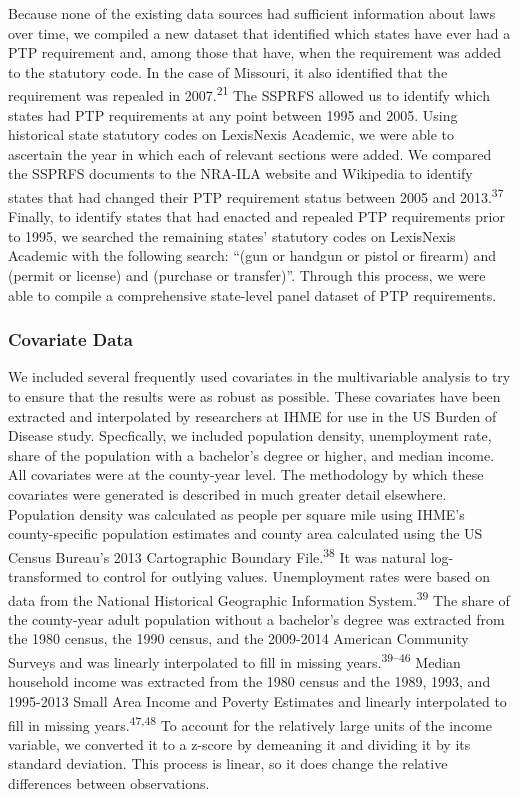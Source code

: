 \documentclass[]{article}
\begin{document}
Because none of the existing data sources had sufficient information
about laws over time, we compiled a new dataset that identified which
states have ever had a PTP requirement and, among those that have, when
the requirement was added to the statutory code. In the case of
Missouri, it also identified that the requirement was repealed in
2007.\textsuperscript{21} The SSPRFS allowed us to identify which states
had PTP requirements at any point between 1995 and 2005. Using
historical state statutory codes on LexisNexis Academic, we were able to
ascertain the year in which each of relevant sections were added. We
compared the SSPRFS documents to the NRA-ILA website and Wikipedia to
identify states that had changed their PTP requirement status between
2005 and 2013.\textsuperscript{37} Finally, to identify states that had
enacted and repealed PTP requirements prior to 1995, we searched the
remaining states' statutory codes on LexisNexis Academic with the
following search: ``(gun or handgun or pistol or firearm) and (permit or
license) and (purchase or transfer)''. Through this process, we were
able to compile a comprehensive state-level panel dataset of PTP
requirements.

\subsubsection{Covariate Data}\label{covariate-data}

We included several frequently used covariates in the multivariable
analysis to try to ensure that the results were as robust as possible.
These covariates have been extracted and interpolated by researchers at
IHME for use in the US Burden of Disease study. Specfically, we included
population density, unemployment rate, share of the population with a
bachelor's degree or higher, and median income. All covariates were at
the county-year level. The methodology by which these covariates were
generated is described in much greater detail elsewhere. Population
density was calculated as people per square mile using IHME's
county-specific population estimates and county area calculated using
the US Census Bureau's 2013 Cartographic Boundary
File.\textsuperscript{38} It was natural log-transformed to control for
outlying values. Unemployment rates were based on data from the National
Historical Geographic Information System.\textsuperscript{39} The share
of the county-year adult population without a bachelor's degree was
extracted from the 1980 census, the 1990 census, and the 2009-2014
American Community Surveys and was linearly interpolated to fill in
missing years.\textsuperscript{39--46} Median household income was
extracted from the 1980 census and the 1989, 1993, and 1995-2013 Small
Area Income and Poverty Estimates and linearly interpolated to fill in
missing years.\textsuperscript{47,48} To account for the relatively
large units of the income variable, we converted it to a z-score by
demeaning it and dividing it by its standard deviation. This process is
linear, so it does change the relative differences between observations.
\end{document}
